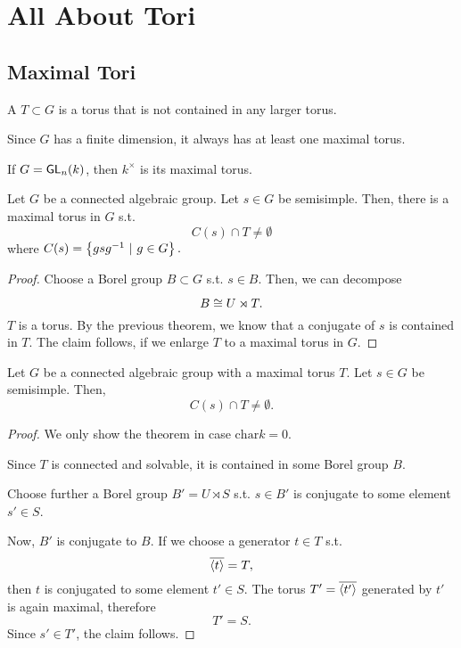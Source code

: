 \section{All About Tori}
\subsection{Maximal Tori}
\begin{definition}
	A  $T \subset G$ is a torus that is not contained in any larger torus.
	
	Since $G$ has a finite dimension, it always has at least one maximal torus.
\end{definition}
\begin{example}
	If $G = \textsf{GL}_n(k)$, then $k^\times$ is its maximal torus.
\end{example}
\begin{lemma}
	Let $G$ be a connected algebraic group. Let $s \in G$ be semisimple. Then, there is a maximal torus in $G$ s.t.
	\[ C(s) \cap T \neq \emptyset \]
	where $C(s) = \left\lbrace gsg^{-1} ~ | ~ g\in G\right\rbrace.$
\end{lemma}
\begin{proof}
	Choose a Borel group $B \subset G$ s.t. $s \in B$. Then, we can decompose
	\[ B \overset{}{\cong} U \rtimes T. \]
	$T$ is a torus. By the previous theorem, we know that a conjugate of $s$ is contained in $T$. The claim follows, if we enlarge $T$ to a maximal torus in $G$.
\end{proof}

\begin{theorem}
	Let $G$ be a connected algebraic group with a maximal torus $T$. Let $s \in G$ be semisimple. Then, 
	\[ C(s) \cap T \neq \emptyset. \]
\end{theorem}
\begin{proof}
	We only show the theorem in case $\mathrm{char} k = 0$.
	
	Since $T$ is connected and solvable, it is contained in some Borel group $B$.
	
	Choose further a Borel group $B' = U \rtimes S$ s.t. $s\in B'$ is conjugate to some element $s' \in S$.
	
	Now, $B'$ is conjugate to $B$. If we choose a generator $t \in T$ s.t.
	\[ \overline{\left<t\right>} = T, \]
	then $t$ is conjugated to some element $t' \in S$. The torus $T' = \overline{\left<t'\right>}$ generated by $t'$ is again maximal, therefore
	\[ T' = S. \]
	Since $s' \in T'$, the claim follows.
\end{proof}

